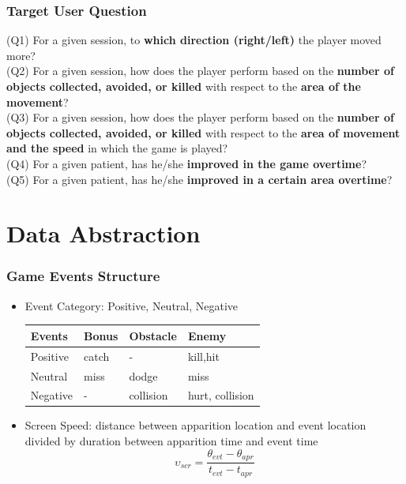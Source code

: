 \documentclass{beamer}
\begin{document}
\begin{frame}
\frametitle{Target User Question}
(Q1) For a given session, to \textbf{which direction (right/left)} the player moved more?\\ 
(Q2) For a given session, how does the player perform based on the \textbf{number of objects collected, avoided, or killed} with respect to the \textbf{area of the movement}?\\
(Q3) For a given session, how does the player perform based on the \textbf{number of objects collected, avoided, or killed} with respect to the \textbf{area of movement and the speed} in which the game is played?\\ 
(Q4) For a given patient, has he/she \textbf{improved in the game overtime}?\\ 
(Q5) For a given patient, has he/she \textbf{improved in a certain area overtime}?


\end{frame}
\section{Data Abstraction}
\begin{frame}
\frametitle{Game Events Structure}
\begin{itemize}
\item Event Category: Positive, Neutral, Negative
\begin{table}[h]
\begin{center}
    \begin{tabular}{| l | l | l | l |}
    \hline
    Events & Bonus & Obstacle & Enemy \\ \hline
    Positive & catch & - & kill,hit\\ \hline
    Neutral & miss & dodge & miss\\ \hline
    Negative & - & collision & hurt, collision\\
    \hline
    \end{tabular}
    \label{tblEventType}
\end{center}
\end{table}
\item Screen Speed: distance between apparition location and event location divided by duration between apparition time and event time
$$ \upsilon_{scr} = \frac{\theta_{evt}-\theta_{apr}}{\textit{t}_{evt}-\textit{t}_{apr}} $$
\end{itemize}
\end{frame}
\end{document}
